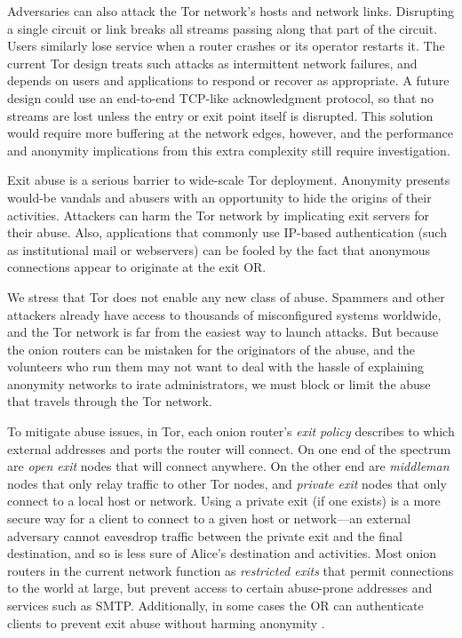 \documentclass[times,10pt,twocolumn]{article}
\begin{document}

Adversaries can also attack the Tor network's hosts and network
links. Disrupting a single circuit or link breaks all streams passing
along that part of the circuit. Users similarly lose service
when a router crashes or its operator restarts it. The current
Tor design treats such attacks as intermittent network failures, and
depends on users and applications to respond or recover as appropriate. A
future design could use an end-to-end TCP-like acknowledgment protocol,
so that no streams are lost unless the entry or exit point itself is
disrupted. This solution would require more buffering at the network
edges, however, and the performance and anonymity implications from this
extra complexity still require investigation.

\label{subsec:exitpolicies}


Exit abuse is a serious barrier to wide-scale Tor deployment. Anonymity
presents would-be vandals and abusers with an opportunity to hide
the origins of their activities. Attackers can harm the Tor network by
implicating exit servers for their abuse. Also, applications that commonly
use IP-based authentication (such as institutional mail or webservers)
can be fooled by the fact that anonymous connections appear to originate
at the exit OR.

We stress that Tor does not enable any new class of abuse. Spammers
and other attackers already have access to thousands of misconfigured
systems worldwide, and the Tor network is far from the easiest way
to launch attacks.
But because the
onion routers can be mistaken for the originators of the abuse,
and the volunteers who run them may not want to deal with the hassle of
explaining anonymity networks to irate administrators, we must block or limit
the abuse that travels through the Tor network.

To mitigate abuse issues, in Tor, each onion router's \emph{exit policy}
describes to which external addresses and ports the router will
connect. On one end of the spectrum are \emph{open exit}
nodes that will connect anywhere. On the other end are \emph{middleman}
nodes that only relay traffic to other Tor nodes, and \emph{private exit}
nodes that only connect to a local host or network.  Using a private
exit (if one exists) is a more secure way for a client to connect to a
given host or network---an external adversary cannot eavesdrop traffic
between the private exit and the final destination, and so is less sure of
Alice's destination and activities. Most onion routers in the current
network function as
\emph{restricted exits} that permit connections to the world at large,
but prevent access to certain abuse-prone addresses and services such
as SMTP.
Additionally, in some cases the OR can authenticate clients to
prevent exit abuse without harming anonymity \cite{or-discex00}.
\end{document}
